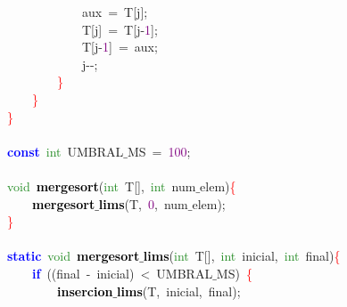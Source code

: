 \mbox{}\ \ \ \ \ \ \ \ \ \ \ \ aux\ \textcolor{BrickRed}{=}\ T\textcolor{BrickRed}{[}j\textcolor{BrickRed}{];} \\
\mbox{}\ \ \ \ \ \ \ \ \ \ \ \ T\textcolor{BrickRed}{[}j\textcolor{BrickRed}{]}\ \textcolor{BrickRed}{=}\ T\textcolor{BrickRed}{[}j\textcolor{BrickRed}{-}\textcolor{Purple}{1}\textcolor{BrickRed}{];} \\
\mbox{}\ \ \ \ \ \ \ \ \ \ \ \ T\textcolor{BrickRed}{[}j\textcolor{BrickRed}{-}\textcolor{Purple}{1}\textcolor{BrickRed}{]}\ \textcolor{BrickRed}{=}\ aux\textcolor{BrickRed}{;} \\
\mbox{}\ \ \ \ \ \ \ \ \ \ \ \ j\textcolor{BrickRed}{-\/-;} \\
\mbox{}\ \ \ \ \ \ \ \ \textcolor{Red}{\}} \\
\mbox{}\ \ \ \ \textcolor{Red}{\}} \\
\mbox{}\textcolor{Red}{\}} \\
\mbox{} \\
\mbox{}\textbf{\textcolor{Blue}{const}}\ \textcolor{ForestGreen}{int}\ UMBRAL$\_$MS\ \textcolor{BrickRed}{=}\ \textcolor{Purple}{100}\textcolor{BrickRed}{;} \\
\mbox{} \\
\mbox{}\textcolor{ForestGreen}{void}\ \textbf{\textcolor{Black}{mergesort}}\textcolor{BrickRed}{(}\textcolor{ForestGreen}{int}\ T\textcolor{BrickRed}{[],}\ \textcolor{ForestGreen}{int}\ num$\_$elem\textcolor{BrickRed}{)}\textcolor{Red}{\{} \\
\mbox{}\ \ \ \ \textbf{\textcolor{Black}{mergesort$\_$lims}}\textcolor{BrickRed}{(}T\textcolor{BrickRed}{,}\ \textcolor{Purple}{0}\textcolor{BrickRed}{,}\ num$\_$elem\textcolor{BrickRed}{);} \\
\mbox{}\textcolor{Red}{\}} \\
\mbox{} \\
\mbox{}\textbf{\textcolor{Blue}{static}}\ \textcolor{ForestGreen}{void}\ \textbf{\textcolor{Black}{mergesort$\_$lims}}\textcolor{BrickRed}{(}\textcolor{ForestGreen}{int}\ T\textcolor{BrickRed}{[],}\ \textcolor{ForestGreen}{int}\ inicial\textcolor{BrickRed}{,}\ \textcolor{ForestGreen}{int}\ final\textcolor{BrickRed}{)}\textcolor{Red}{\{} \\
\mbox{}\ \ \ \ \textbf{\textcolor{Blue}{if}}\ \textcolor{BrickRed}{((}final\ \textcolor{BrickRed}{-}\ inicial\textcolor{BrickRed}{)}\ \textcolor{BrickRed}{\textless{}}\ UMBRAL$\_$MS\textcolor{BrickRed}{)}\ \textcolor{Red}{\{} \\
\mbox{}\ \ \ \ \ \ \ \ \textbf{\textcolor{Black}{insercion$\_$lims}}\textcolor{BrickRed}{(}T\textcolor{BrickRed}{,}\ inicial\textcolor{BrickRed}{,}\ final\textcolor{BrickRed}{);} \\
